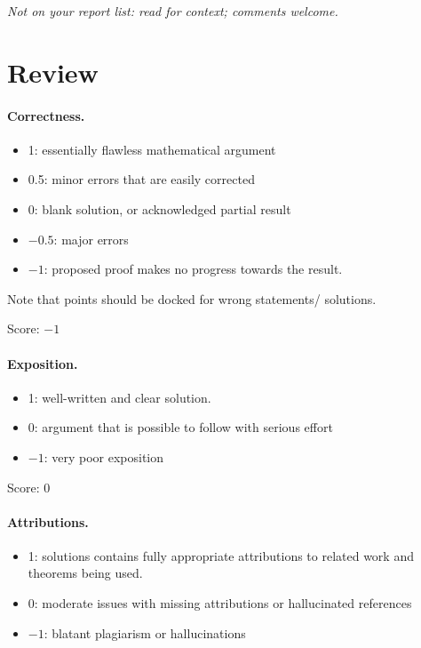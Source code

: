 \documentclass[11pt]{article}
\theoremstyle{definition}
\begin{document}
\maketitle
\noindent\textit{Not on your report list: read for context; comments welcome.}

\section{Review}

\paragraph{Correctness.}
\begin{itemize}
	\item  1: essentially flawless mathematical argument
	\item  0.5: minor errors that are easily corrected
	\item  0: blank solution, or acknowledged partial result
	\item  $-0.5$: major errors
	\item  $-1$: proposed proof makes no progress towards the result.
\end{itemize}
Note that points should be docked for wrong statements/ solutions.

\noindent Score: $-1$

\paragraph{Exposition.}
\begin{itemize}
	\item  1: well-written and clear solution.
	\item  0: argument that is possible to follow with serious effort
	\item  $-1$: very poor exposition
\end{itemize}

\noindent Score: 0

\paragraph{Attributions.}
\begin{itemize}
	\item  1: solutions contains fully appropriate attributions
		to related work and theorems being used.
	\item  0: moderate issues with missing attributions or hallucinated references
	\item  $-1$: blatant plagiarism or hallucinations
\end{itemize}
\end{document}
